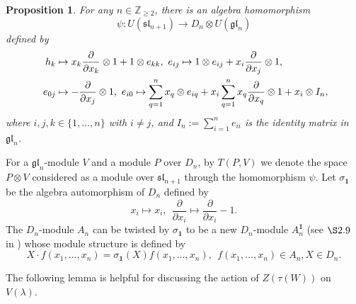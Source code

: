 \documentclass[12pt,a4paper]{amsart}
\newtheorem{proposition}[theorem]{Proposition}%
\numberwithin{equation}{section}
\newcommand{\Z}{\mathbb{Z}}
\def\sl{\mathfrak{sl}}
\def\gl{\mathfrak{gl}}
\def\b1{\mathbf{1}}
\def\l{\lambda}
\begin{document}
\begin{proposition}\label{s-iso} For any  $n\in \Z_{\geq 2}$, there is an algebra homomorphism
$$\psi: U(\sl_{n+1}) \rightarrow D_{n}\otimes U(\gl_n)$$
defined by
\begin{equation}\label{3.1}\aligned
\ h_k& \mapsto x_k\frac{\partial}{\partial x_k}\otimes 1+1\otimes e_{kk},
\ e_{ij} \mapsto 1\otimes e_{ij}+x_i\frac{\partial}{\partial x_j}\otimes 1,\\
\ e_{0j}&\mapsto -\frac{\partial}{\partial x_j}\otimes 1,
\ e_{i0}\mapsto  \sum_{q=1}^nx_q\otimes e_{iq}+
x_i\sum_{q=1}^nx_q\frac{\partial}{\partial x_q}\otimes 1+ x_i\otimes I_n,
\endaligned \end{equation}   where $i,j,k \in \{1,\dots,n\}$ with $i\neq j$, and $I_n:=\sum_{i=1}^n e_{ii}$ is the identity matrix in $\gl_n$.
\end{proposition}

For a  $\gl_n$-module $V$ and a  module $P$ over $D_n$,  by $T(P, V ) $ we denote the space $P \otimes  V$
considered as a module over $ \sl_{n+1}$ through the homomorphism $\psi$. Let $\sigma_{\b1}$ be the algebra automorphism of $D_n$ defined by $$x_i\mapsto x_i, \ \ \frac{\partial}{\partial x_i} \mapsto \frac{\partial}{\partial x_i}-1.$$
The $D_n$-module $A_n$ can be twisted by $\sigma_{\b1}$ to be a new $D_n$-module $A_n^{\b1}$ (see $\S 2.9$ in \cite{GN}) whose module structure is defined by
\begin{equation}\label{A-mod}X\cdot f(x_1,\dots,x_n)=\sigma_{\b1}(X)f(x_1,\dots,x_n), \ \ f(x_1,\dots,x_n)\in A_n, X\in D_n.\end{equation}


The following lemma is helpful for discussing the action of $Z(\tau(W))$ on $V(\l)$.
\end{document}
